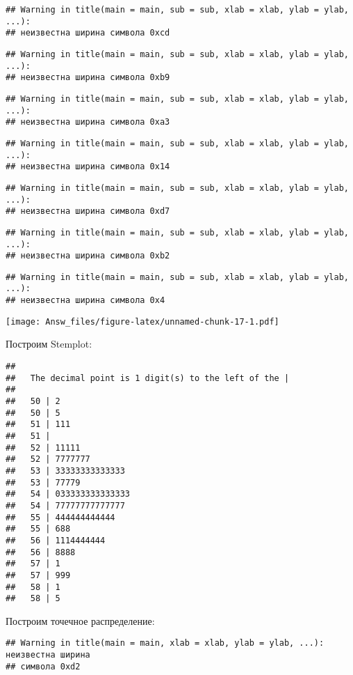 \documentclass[,]{article}
\begin{document}
\begin{verbatim}
## Warning in title(main = main, sub = sub, xlab = xlab, ylab = ylab, ...):
## неизвестна ширина символа 0xcd
\end{verbatim}

\begin{verbatim}
## Warning in title(main = main, sub = sub, xlab = xlab, ylab = ylab, ...):
## неизвестна ширина символа 0xb9
\end{verbatim}

\begin{verbatim}
## Warning in title(main = main, sub = sub, xlab = xlab, ylab = ylab, ...):
## неизвестна ширина символа 0xa3
\end{verbatim}

\begin{verbatim}
## Warning in title(main = main, sub = sub, xlab = xlab, ylab = ylab, ...):
## неизвестна ширина символа 0x14
\end{verbatim}

\begin{verbatim}
## Warning in title(main = main, sub = sub, xlab = xlab, ylab = ylab, ...):
## неизвестна ширина символа 0xd7
\end{verbatim}

\begin{verbatim}
## Warning in title(main = main, sub = sub, xlab = xlab, ylab = ylab, ...):
## неизвестна ширина символа 0xb2
\end{verbatim}

\begin{verbatim}
## Warning in title(main = main, sub = sub, xlab = xlab, ylab = ylab, ...):
## неизвестна ширина символа 0x4
\end{verbatim}

\texttt{[image: Answ\_files/figure-latex/unnamed-chunk-17-1.pdf]}

Построим Stemplot:

\begin{verbatim}
## 
##   The decimal point is 1 digit(s) to the left of the |
## 
##   50 | 2
##   50 | 5
##   51 | 111
##   51 | 
##   52 | 11111
##   52 | 7777777
##   53 | 33333333333333
##   53 | 77779
##   54 | 033333333333333
##   54 | 77777777777777
##   55 | 444444444444
##   55 | 688
##   56 | 1114444444
##   56 | 8888
##   57 | 1
##   57 | 999
##   58 | 1
##   58 | 5
\end{verbatim}

Построим точечное распределение:

\begin{verbatim}
## Warning in title(main = main, xlab = xlab, ylab = ylab, ...): неизвестна ширина
## символа 0xd2
\end{verbatim}
\end{document}
